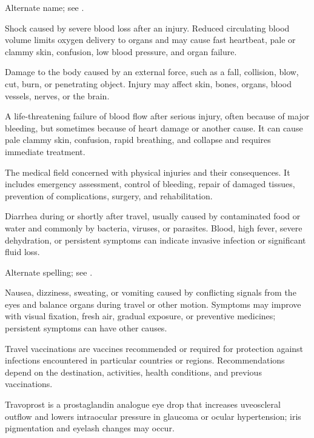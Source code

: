  Alternate name; see .

 Shock caused by severe blood loss after an injury. Reduced circulating blood volume limits oxygen delivery to organs and may cause fast heartbeat, pale or clammy skin, confusion, low blood pressure, and organ failure.

 Damage to the body caused by an external force, such as a fall, collision, blow, cut, burn, or penetrating object. Injury may affect skin, bones, organs, blood vessels, nerves, or the brain.

 A life-threatening failure of blood flow after serious injury, often because of major bleeding, but sometimes because of heart damage or another cause. It can cause pale clammy skin, confusion, rapid breathing, and collapse and requires immediate treatment.

 The medical field concerned with physical injuries and their consequences. It includes emergency assessment, control of bleeding, repair of damaged tissues, prevention of complications, surgery, and rehabilitation.

 Diarrhea during or shortly after travel, usually caused by contaminated food or water and commonly by bacteria, viruses, or parasites. Blood, high fever, severe dehydration, or persistent symptoms can indicate invasive infection or significant fluid loss.

 Alternate spelling; see .

 Nausea, dizziness, sweating, or vomiting caused by conflicting signals from the eyes and balance organs during travel or other motion. Symptoms may improve with visual fixation, fresh air, gradual exposure, or preventive medicines; persistent symptoms can have other causes.

 Travel vaccinations are vaccines recommended or required for protection against infections encountered in particular countries or regions. Recommendations depend on the destination, activities, health conditions, and previous vaccinations.

 Travoprost is a prostaglandin analogue eye drop that increases uveoscleral outflow and lowers intraocular pressure in glaucoma or ocular hypertension; iris pigmentation and eyelash changes may occur.

